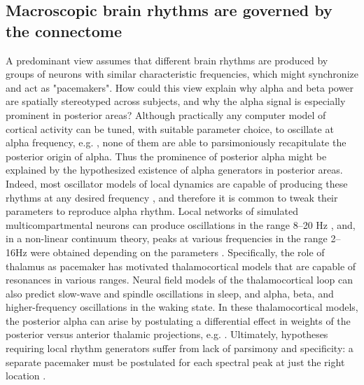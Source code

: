 \subsection{Macroscopic brain rhythms are governed by the connectome}

A predominant view assumes that different brain rhythms are produced by
groups of neurons with similar characteristic frequencies, which might
synchronize and act as "pacemakers". How could this view explain why
alpha and beta power are spatially stereotyped across subjects, and why
the alpha signal is especially prominent in posterior areas? Although
practically any computer model of cortical activity can be tuned, with
suitable parameter choice, to oscillate at alpha frequency, e.g.
\cite{liley_alpha_1999,robinson_multiscale_2005,Nakagawa2014,
Deco2012,david_neural_2003,nunez_theoretical_2006,vijayan_thalamocortical_2013}, none of them are able to parsimoniously recapitulate the posterior origin of alpha. Thus the
prominence of posterior alpha might be explained by the hypothesized
existence of alpha generators in posterior areas. Indeed, most
oscillator models of local dynamics are capable of producing these
rhythms at any desired frequency \cite{liley_alpha_1999,david_neural_2003,van_rotterdam_model_1982,liley_spatially_2002,Spiegler2013}, and therefore it is common to tweak their parameters to reproduce alpha
rhythm. Local networks of simulated multicompartmental neurons can
produce oscillations in the range 8--20 Hz \cite{liley_alpha_1999}, and, in
a non-linear continuum theory, peaks at various frequencies in the range
2--16Hz were obtained depending on the parameters \cite{liley_spatially_2002}.
Specifically, the role of thalamus as pacemaker has motivated
thalamocortical models \cite{izhikevich_large-scale_2008,robinson_multiscale_2005} that are capable of resonances in various ranges. Neural field models of the thalamocortical
loop \cite{robinson_multiscale_2005} can also predict slow-wave and spindle
oscillations in sleep, and alpha, beta, and higher-frequency
oscillations in the waking state. In these thalamocortical models, the
posterior alpha can arise by postulating a differential effect in
weights of the posterior versus anterior thalamic projections, e.g.
\cite{vijayan_thalamocortical_2013}. Ultimately, hypotheses requiring local rhythm
generators suffer from lack of parsimony and specificity: a separate
pacemaker must be postulated for each spectral peak at just the right
location \cite{nunez_study_1981}.

